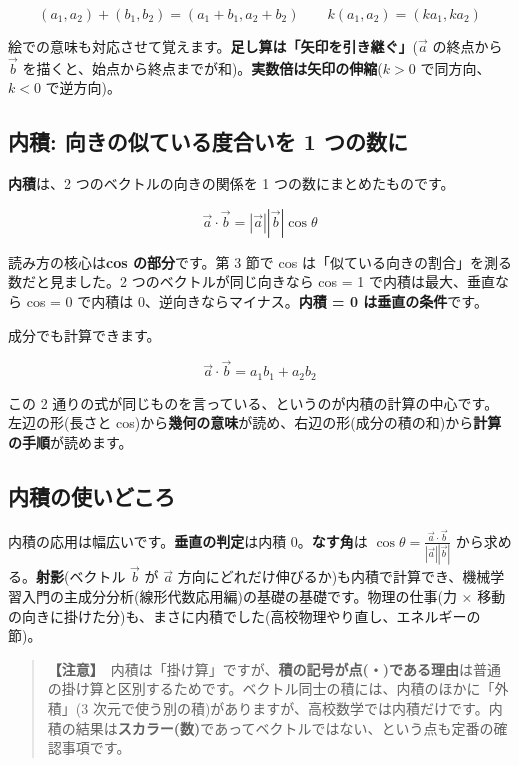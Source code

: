 \documentclass{article}
\begin{document}
\[ (a_{1}, a_{2}) + (b_{1}, b_{2}) = (a_{1} + b_{1}, a_{2} + b_{2}) \qquad k(a_{1}, a_{2}) = (ka_{1}, ka_{2}) \]

絵での意味も対応させて覚えます。\textbf{足し算は「矢印を引き継ぐ」}(\( \vec{a} \) の終点から \( \vec{b} \) を描くと、始点から終点までが和)。\textbf{実数倍は矢印の伸縮}(\( k > 0 \) で同方向、\( k < 0 \) で逆方向)。

\subsection{内積: 向きの似ている度合いを 1 つの数に}

\textbf{内積}は、2 つのベクトルの向きの関係を 1 つの数にまとめたものです。

\[ \vec{a} \cdot \vec{b} = |\vec{a}||\vec{b}|\cos\theta \]

読み方の核心は\textbf{cos の部分}です。第 3 節で cos は「似ている向きの割合」を測る数だと見ました。2 つのベクトルが同じ向きなら cos = 1 で内積は最大、垂直なら cos = 0 で内積は 0、逆向きならマイナス。\textbf{内積 = 0 は垂直の条件}です。

成分でも計算できます。

\[ \vec{a} \cdot \vec{b} = a_{1}b_{1} + a_{2}b_{2} \]

この 2 通りの式が同じものを言っている、というのが内積の計算の中心です。左辺の形(長さと cos)から\textbf{幾何の意味}が読め、右辺の形(成分の積の和)から\textbf{計算の手順}が読めます。

\subsection{内積の使いどころ}

内積の応用は幅広いです。\textbf{垂直の判定}は内積 0。\textbf{なす角}は \( \cos\theta = \frac{\vec{a} \cdot \vec{b}}{|\vec{a}||\vec{b}|} \) から求める。\textbf{射影}(ベクトル \( \vec{b} \) が \( \vec{a} \) 方向にどれだけ伸びるか)も内積で計算でき、機械学習入門の主成分分析(線形代数応用編)の基礎の基礎です。物理の仕事(力 × 移動の向きに掛けた分)も、まさに内積でした(高校物理やり直し、エネルギーの節)。

\begin{quote}
\textbf{【注意】}\ 内積は「掛け算」ですが、\textbf{積の記号が点(・)である理由}は普通の掛け算と区別するためです。ベクトル同士の積には、内積のほかに「外積」(3 次元で使う別の積)がありますが、高校数学では内積だけです。内積の結果は\textbf{スカラー(数)}であってベクトルではない、という点も定番の確認事項です。
\end{quote}
\end{document}
